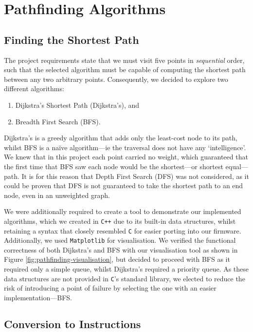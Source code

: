 \documentclass[conference]{IEEEtran}
\begin{document}
\section{Pathfinding Algorithms \label{sect:pathfinding-algorithms}}

\subsection{Finding the Shortest Path}

The project requirements state that we must visit five points in \emph{sequential} order, such that the selected algorithm must be capable of computing the shortest path between any two arbitrary points.
Consequently, we decided to explore two different algorithms:
\begin{enumerate}
	\item Dijkstra's Shortest Path (Dijkstra's), and
	\item Breadth First Search (BFS).
\end{enumerate}
Dijkstra's is a greedy algorithm that adds only the least-cost node to its path, whilst BFS is a naïve algorithm—ie the traversal does not have any `intelligence'.
We knew that in this project each point carried no weight, which guaranteed that the first time that BFS saw each node would be the shortest—or shortest equal—path.
It is for this reason that Depth First Search (DFS) was not considered, as it could be proven that DFS is not guaranteed to take the shortest path to an end node, even in an unweighted graph.

We were additionally required to create a tool to demonstrate our implemented algorithms, which we created in \texttt{C++} due to its built-in data structures, whilst retaining a syntax that closely resembled \texttt{C} for easier porting into our firmware.
Additionally, we used \texttt{Matplotlib} for visualisation.
We verified the functional correctness of both Dijkstra's and BFS with our visualisation tool as shown in Figure \ref{fig:pathfinding-visualisation}, but decided to proceed with BFS as it required only a simple queue, whilst Dijkstra's required a priority queue.
As these data structures are not provided in \texttt{C}'s standard library, we elected to reduce the risk of introducing a point of failure by selecting the one with an easier implementation—BFS.

\subsection{Conversion to Instructions}
\end{document}

